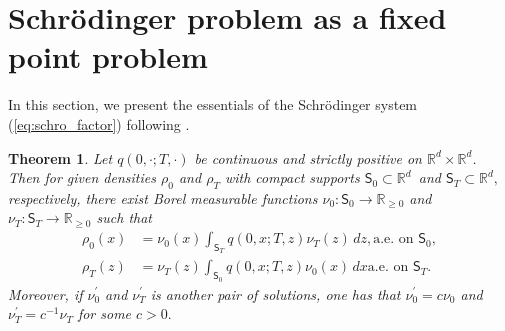\documentclass[a4paper,11pt]{amsart}
\theoremstyle{plain}
\newtheorem{theorem}{Theorem}
\theoremstyle{remark}
\begin{document}
\section{Schr\"{o}dinger problem as a fixed point problem}\label{alg:iterative_kernel}

In this section, we present the essentials of the Schr\"odinger system 
(\ref{eq:schro_factor})
following  \cite{CGP2016}.

\begin{theorem}{ \cite[Prop.~1]{CGP2016}}
\label{pavon}  Let $q(0,\cdot;T,\cdot)$ be continuous and strictly positive on
$\mathbb{R}^d\times\mathbb{R}^d$. Then for
given densities $\rho_{0}$ and $\rho_{T}$ with compact supports $\mathsf{S}_{0}%
\subset\mathbb{R}^{d}$\ and $\mathsf{S}_{T}\subset\mathbb{R}^{d},$ respectively, there
exist Borel measurable functions $\nu_{0}:\mathsf{S}_{0}\rightarrow\mathbb{R}_{\geq0}$ and
$\nu_{T}:\mathsf{S}_{T}\rightarrow\mathbb{R}_{\geq0}$ such that
\begin{align}
\rho_{0}(x) &  =\nu_{0}(x)\int_{\mathsf{S}_{T}}q(0,x;T,z)\nu_{T}(z)\,dz,\text{
a.e. on }\mathsf{S}_{0},\nonumber\\
\rho_{T}(z) &  =\nu_{T}(z)\int_{\mathsf{S}_{0}}q(0,x;T,z)\nu_{0}(x)\,dx\text{
a.e. on }\mathsf{S}_{T}.\label{SPT}%
\end{align}
Moreover, if $\nu_{0}^{\prime}$ and $\nu_{T}^{\prime}$ is another pair of solutions, one
has that $\nu_{0}^{\prime}=c\nu_{0}$ and $\nu_{T}^{\prime}=c^{-1}\nu_{T}$ for
some $c>0.$
\end{theorem}
\end{document}
